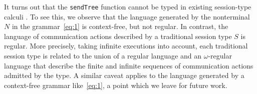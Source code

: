 It turns out that the \lstinline|sendTree| function cannot be typed in existing
session-type calculi
\cite{DBLP:conf/concur/Honda93,DBLP:journals/acta/GayH05,DBLP:conf/esop/HondaVK98,DBLP:journals/jfp/GayV10,DBLP:conf/parle/TakeuchiHK94,DBLP:conf/esop/ToninhoCP13}. To
see this, we observe that the language generated by the nonterminal
$N$ in the grammar~\eqref{eq:1}
is context-free, but not regular.
In contrast, the language of communication actions described by a
traditional session type $S$ is regular. 
More precisely, taking infinite executions into account, 
each traditional session type is related to the union of a regular language and an
$\omega$-regular language that describe the finite and infinite sequences of communication actions
admitted by the type. A similar caveat applies to the language generated by a context-free grammar
like~\eqref{eq:1}, a point which we leave for future work. 

